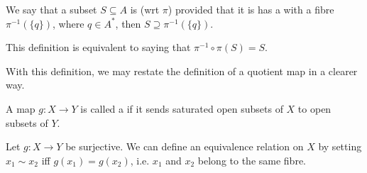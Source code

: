 \documentclass[notoc,notitlepage]{tufte-book}
\begin{document}
\begin{defn}[Saturated]\label{defn:saturated}
  We say that a subset $S \subseteq A$ is  (wrt $\pi$) provided that it is has
  a  with a fibre $\pi^{-1}(\{ q \})$, where $q \in A^*$, then
  $S \supseteq \pi^{-1}(\{ q \})$.
\end{defn}

\begin{note}
  This definition is equivalent to saying that $\pi^{-1} \circ \pi (S) = S$.
\end{note}

With this definition, we may restate the definition of a quotient map in a clearer way.

\begin{defn}\label{defn:quotient_map}
  A map $g : X \to Y$ is called a  if it sends saturated open subsets of $X$
  to open subsets of $Y$.
\end{defn}

\begin{eg}
  Let $g : X \to Y$ be surjective. We can define an equivalence relation on $X$ by setting
  $x_1 \sim x_2$ iff $g(x_1) = g(x_2)$, i.e. $x_1$ and $x_2$ belong to the same fibre.
\end{eg}
\end{document}
